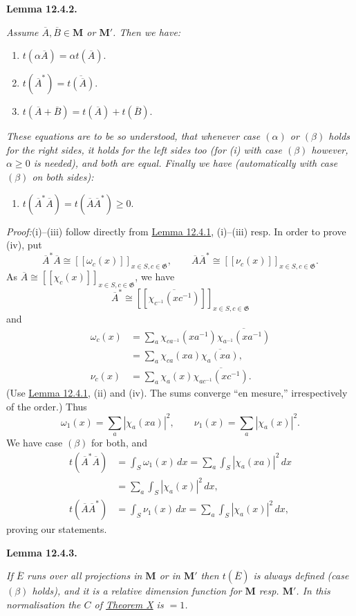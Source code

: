 \documentclass[12pt,b5paper,twoside]{article}
\newcommand{\M}{\mathbf M}
\newcommand{\Lemma}[1]{%
  \par\smallskip\noindent\phantomsection\label{lem:#1}\textbf{Lemma #1.}\enspace
}
\newcommand{\Proof}{\par\noindent\textit{Proof:}\enspace}
\newcommand{\lemref}[1]{\hyperref[lem:#1]{Lemma #1}}
\newcommand{\thmref}[1]{\hyperref[thm:#1]{Theorem #1}}
\begin{document}
\Lemma{12.4.2}
\emph{Assume $\overline A,\overline B\in\M$ or $\M'$. Then we have:}
\begin{enumerate}[label=(\roman*)]
\item $t(\alpha\overline A)=\alpha t(\overline A)$.
\item $t(\overline A^*)=\overline{t(\overline A)}$.
\item $t(\overline A+\overline B)=t(\overline A)+t(\overline B)$.
\end{enumerate}
\emph{These equations are to be so understood, that whenever case
$(\alpha)$ or $(\beta)$
holds for the right sides, it holds for the left sides too (for (i) with case
$(\beta)$ however, $\alpha\geq0$ is needed), and both are equal. Finally we
have (automatically with case $(\beta)$ on both sides):}
\begin{enumerate}[label=(\roman*),start=4]
\item $t(\overline A^*\overline A)
  =t(\overline A\overline A^*)\geq0$.
\end{enumerate}

\Proof (i)--(iii) follow directly from \lemref{12.4.1}, (i)--(iii) resp. In
order to prove (iv), put
\[
 \overline A^*\overline A
 \cong[[\omega_c(x)]]_{x\in S,c\in\mathfrak G},
 \qquad
 \overline A\overline A^*
 \cong[[\nu_c(x)]]_{x\in S,c\in\mathfrak G}.
\]
As $\overline A\cong[[\chi_c(x)]]_{x\in S,c\in\mathfrak G}$, we have
\[
 \overline A^*\cong
 [[\overline{\chi_{c^{-1}}(xc^{-1})}]]_{x\in S,c\in\mathfrak G}
\]
and
\begin{align*}
 \omega_c(x)
 &=\sum_a\chi_{ca^{-1}}(xa^{-1})
       \overline{\chi_{a^{-1}}(xa^{-1})}\\
 &=\sum_a\chi_{ca}(xa)\overline{\chi_a(xa)},\\
 \nu_c(x)
 &=\sum_a\chi_a(x)\overline{\chi_{ac^{-1}}(xc^{-1})}.
\end{align*}
(Use \lemref{12.4.1}, (ii) and (iv). The sums converge ``en mesure,''
irrespectively of the order.) Thus
\[
 \omega_1(x)=\sum_a|\chi_a(xa)|^2,
 \qquad
 \nu_1(x)=\sum_a|\chi_a(x)|^2.
\]
We have case $(\beta)$ for both, and
\begin{align*}
 t(\overline A^*\overline A)
 &=\int_S\omega_1(x)\,dx
 =\sum_a\int_S|\chi_a(xa)|^2\,dx\\
 &=\sum_a\int_S|\chi_a(x)|^2\,dx,\\
 t(\overline A\overline A^*)
 &=\int_S\nu_1(x)\,dx
 =\sum_a\int_S|\chi_a(x)|^2\,dx,
\end{align*}
proving our statements.

\Lemma{12.4.3}
\emph{If $\overline E$ runs over all projections in $\M$ or in $\M'$ then
$t(\overline E)$ is always defined (case $(\beta)$ holds), and it is a relative
dimension function for $\M$ resp. $\M'$. In this normalisation the $C$ of
\thmref{X} is $=1$.}
\end{document}
